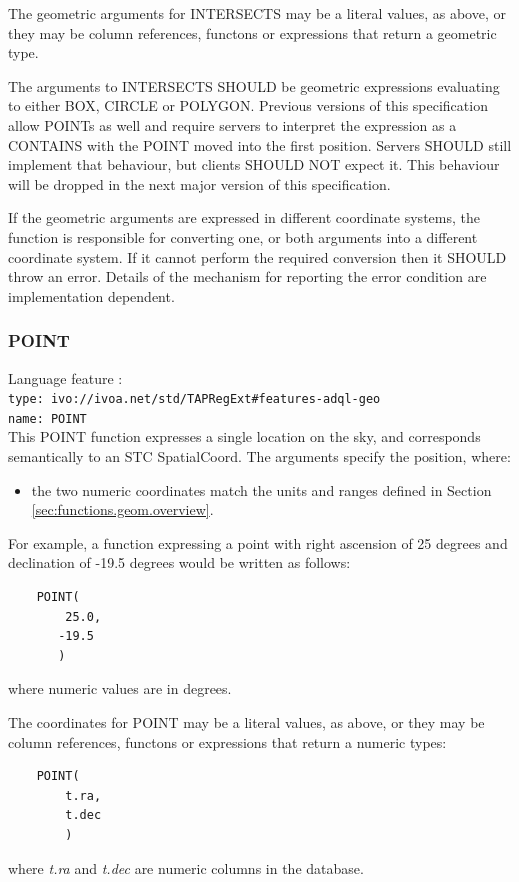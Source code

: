 \documentclass[11pt,a4paper]{ivoa}
\begin{document}
The geometric arguments for INTERSECTS may be a literal values, as above,
or they may be column references, functons or expressions that return
a geometric type.

The arguments to INTERSECTS SHOULD be geometric expressions evaluating to
either BOX, CIRCLE or POLYGON.
Previous versions of this
specification allow POINTs as well and require servers to interpret the
expression as a CONTAINS with the POINT moved into the first position. Servers
SHOULD still implement that behaviour, but clients SHOULD NOT expect it. This
behaviour will be dropped in the next major version of this specification.

If the geometric arguments are expressed in different coordinate systems,
the function is responsible for converting one, or both arguments into a
different coordinate system.
If it cannot perform the required conversion then it SHOULD throw an
error.
Details of the mechanism for reporting the error condition are
implementation dependent.

\subsubsection{POINT}
\label{sec:functions.geom.point}
{\footnotesize Language feature :}\\
{\footnotesize \verb|type: ivo://ivoa.net/std/TAPRegExt#features-adql-geo|}\\
{\footnotesize \verb|name: POINT|}\\

This POINT function expresses a single location on the sky, and corresponds
semantically to an STC SpatialCoord. The arguments
specify the position, where:

\begin{itemize}
    \item the two numeric coordinates match the units and ranges defined in Section \ref{sec:functions.geom.overview}.
\end{itemize}

For example, a function expressing a point with right ascension of 25 degrees
and declination of -19.5 degrees would be written as follows:
\begin{verbatim}
    POINT(
        25.0,
       -19.5
       )
\end{verbatim}
\noindent
where numeric values are in degrees.

The coordinates for POINT may be a literal values, as above,
or they may be column references, functons or expressions that return
a numeric types:
\begin{verbatim}
    POINT(
        t.ra,
        t.dec
        )
\end{verbatim}
\noindent
where \textit{t.ra} and \textit{t.dec} are numeric columns in the database.
\end{document}
